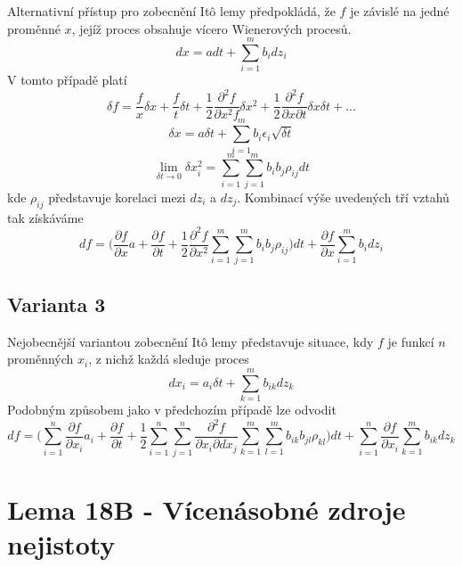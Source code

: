 \documentclass[a4paper]{book}
\begin{document}
Alternativní přístup pro zobecnění It\^o lemy předpokládá, že $f$ je závislé na jedné proměnné $x$, jejíž proces obsahuje vícero Wienerových procesů.
\begin{equation*}
dx = a dt + \sum^{m}_{i=1}b_idz_i
\end{equation*}
V tomto případě platí
\begin{equation*}
\delta f = \frac{f}{x}\delta x + \frac{f}{t}\delta t + \frac{1}{2}\frac{\partial^2f}{\partial x^2f}\delta x^2 + \frac{1}{2}\frac{\partial^2f}{\partial x \partial t}\delta x \delta t + ...
\end{equation*}
\begin{equation*}
\delta x = a \delta t + \sum^{m}_{i=1}b_i\epsilon_i \sqrt{\delta t}
\end{equation*}
\begin{equation*}
\lim_{\delta t \to 0} \delta x^2_i = \sum^{m}_{i=1} \sum^{m}_{j=1}b_i b_j \rho_{ij}dt
\end{equation*}
kde $\rho_{ij}$ představuje korelaci mezi $dz_i$ a $dz_j$. Kombinací výše uvedených tří vztahů tak získáváme
\begin{equation*}
df = \Bigg( \frac{\partial f}{\partial x}a + \frac{\partial f}{\partial t} + \frac{1}{2}\frac{\partial^2 f}{\partial x^2} \sum^m_{i=1}\sum^m_{j=1}b_ib_j\rho_{ij} \Bigg)dt + \frac{\partial f}{\partial x}\sum^{m}_{i=1}b_idz_i
\end{equation*}

\subsection{Varianta 3}

Nejobecnější variantou zobecnění It\^o lemy představuje situace, kdy $f$ je funkcí $n$ proměnných $x_i$, z nichž každá sleduje proces
\begin{equation*}
d x_i = a_i \delta t + \sum^{m}_{k=1}b_{ik}dz_k
\end{equation*}
Podobným způsobem jako v předchozím případě lze odvodit
\begin{equation*}
df = \Bigg( \sum^n_{i=1} \frac{\partial f}{\partial x_i}a_i + \frac{\partial f}{\partial t} + \frac{1}{2}\sum^n_{i=1}\sum^n_{j=1}\frac{\partial^2 f}{\partial x_i \partial dx_j} \sum^m_{k=1}\sum^m_{l=1}b_{ik}b_{jl}\rho_{kl} \Bigg)dt + \sum^n_{i=1}\frac{\partial f}{\partial x_i}\sum^{m}_{k=1}b_{ik}dz_k
\end{equation*}

\section{Lema 18B - Vícenásobné zdroje nejistoty}
\end{document}
